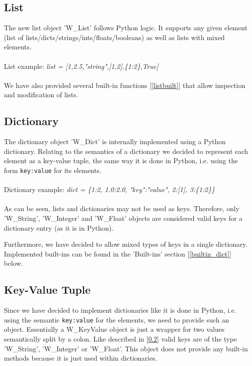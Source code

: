 \documentclass{article}
\begin{document}
\subsection{List}
The new list object 'W\_List' follows Python logic. It supports any given element (list of lists/dicts/strings/ints/floats/booleans) as well as lists with mixed elements.\\
\\ List example: \textit{list = [1,2.5,"string",[1,2],\{1:2\},True]} \\\\
We have also provided several built-in functions [\ref{listbuilt}] that allow inspection and modification of lists.

\subsection{Dictionary}
\label{dicts}
The dictionary object 'W\_Dict' is internally implemented using a Python dictionary.
Relating to the semantics of a dictionary we decided to represent each element as a key-value tuple, the same way it is done in Python, i.e. using the form \texttt{key:value} for its elements. \\\\ Dictionary example: \textit{dict = \{1:2, 1.0:2.0, "key":"value", 2:[1], 3:\{1:2\}\}} \\\\
As can be seen, lists and dictionaries may not be used as keys. Therefore, only 'W\_String', 'W\_Integer' and 'W\_Float' objects are considered valid keys for a dictionary entry (as it is in Python).

Furthermore, we have decided to allow mixed types of keys in a single dictionary. Implemented built-ins can be found in the 'Built-ins' section [\ref{builtin_dict}] below.

\subsection{Key-Value Tuple}
Since we have decided to implement dictionaries like it is done in Python, i.e. using the semantic \texttt{key:value} for the elements, we need to provide such an object.
Essentially a W\_KeyValue object is just a wrapper for two values semantically split by a colon.
Like described in [\ref{dicts}] valid keys are of the type 'W\_String', 'W\_Integer' or 'W\_Float'. This object does not provide any built-in methods because it is just used within dictionaries.
\end{document}
